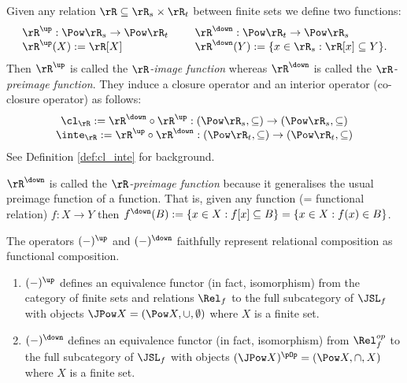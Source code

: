 \documentclass{article}
\begin{document}
\begin{definition}
\label{def:up_down}
Given any relation $\rR \subseteq \rR_s \times \rR_t$ between finite sets we define two functions:
\[
\begin{tabular}{lcl}
$\rR^\up : \Pow \rR_s \to \Pow \rR_t$
&&
$\rR^\down : \Pow \rR_t \to \Pow \rR_s$
\\
$\rR^\up (X) := \rR[X]$
&&
$\rR^\down (Y) := \{ x \in \rR_s : \rR[x] \subseteq Y \}$.
\end{tabular}
\]
Then $\rR^\up$ is called the \emph{$\rR$-image function} whereas $\rR^\down$ is called the \emph{$\rR$-preimage function}. They induce a closure operator and an interior operator (co-closure operator) as follows:
\[
\begin{tabular}{c}
$\cl_\rR := \rR^\down \circ \rR^\up : (\Pow \rR_s,\subseteq) \to (\Pow \rR_s,\subseteq)$
\\
$\inte_\rR := \rR^\up \circ \rR^\down : (\Pow \rR_t,\subseteq) \to (\Pow \rR_t,\subseteq)$
\end{tabular}
\]
See Definition \ref{def:cl_inte} for background.
\endbox
\end{definition}

\smallskip

\begin{note}
$\rR^\down$ is called the \emph{$\rR$-preimage function} because it generalises the usual preimage function of a function. That is, given any function (= functional relation) $f : X \to Y$ then $f^\down(B) := \{ x \in X : f[x] \subseteq B \} = \{ x \in X : f(x) \in B \}$. 
\end{note}

\smallskip

\begin{note}
The operators $(-)^\up$ and $(-)^\down$ faithfully represent relational composition as functional composition.
\begin{enumerate}
\item
$(-)^\up$ defines an equivalence functor (in fact, isomorphism) from the category of finite sets and relations $\Rel_f$ to the full subcategory of  $\JSL_f$  with objects $\JPow X = (\Pow X,\cup,\emptyset)$ where $X$ is a finite set.
\item
$(-)^\down$ defines an equivalence functor (in fact, isomorphism) from $\Rel_f^{op}$ to the full subcategory of $\JSL_f$ with objects $(\JPow X)^{\pOp} = (\Pow X,\cap,X)$ where $X$ is a finite set. \endbox
\end{enumerate}
\end{note}
\end{document}
